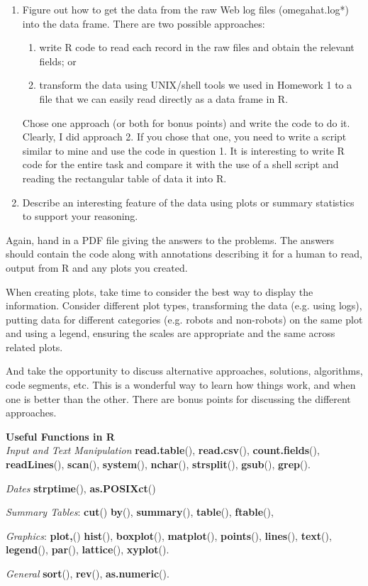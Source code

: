 \documentclass[12pt]{article}
\def\SFunction#1{\textbf{#1}()}
\begin{document}
\begin{enumerate}
\item
Figure out how to get the data from
the raw Web log files (omegahat.log*) 
into the data frame.
There are two possible approaches:
\begin{enumerate}
\item write R code to read each record in the raw files and obtain
  the relevant fields; or
\item transform the data using UNIX/shell tools we used in Homework 1
to a file that we can easily read directly as a data frame in R.
\end{enumerate}
Chose one approach (or both for bonus points) and write
the code to do it.
Clearly, I did approach 2. If you chose that one, you need
to write a script similar to mine and use the code in question 1. 
It is interesting to write R code for the entire task
and compare it with the use of a shell script and reading
the rectangular table of data it into R.


\item Describe an interesting feature of the data
using plots or summary statistics to support
your reasoning.


\end{enumerate} 


Again, hand in a PDF file giving the answers
to the problems.  The answers should contain
the code along with annotations describing it for a human
to read,  output from R and any plots you created.


When creating plots, take time to consider the best
way to display the information.
Consider different plot types, transforming the data
(e.g. using logs),  putting data for different categories
(e.g. robots and non-robots)
on the same plot and using a legend,
ensuring the scales are appropriate and the same across related plots.

And take the opportunity to discuss alternative approaches,
solutions, algorithms, code segments, etc.  This is a wonderful
way to learn how things work, and when one is better than the other.
There are bonus points for discussing the different approaches.


\textbf{Useful Functions in R}\\
\textit{Input and Text Manipulation}
\SFunction{read.table}, \SFunction{read.csv},
\SFunction{count.fields},
\SFunction{readLines},
\SFunction{scan},
\SFunction{system},
\SFunction{nchar},
\SFunction{strsplit},
\SFunction{gsub},
\SFunction{grep}.

\textit{Dates}
\SFunction{strptime},
\SFunction{as.POSIXct}


\textit{Summary Tables}:
\SFunction{cut}
\SFunction{by},
\SFunction{summary},
\SFunction{table},
\SFunction{ftable},

\textit{Graphics}: 
\SFunction{plot,}
\SFunction{hist},
\SFunction{boxplot},
\SFunction{matplot},
\SFunction{points},
\SFunction{lines},
\SFunction{text},
\SFunction{legend},
\SFunction{par},
\SFunction{lattice},
\SFunction{xyplot}.


\textit{General}
\SFunction{sort},
\SFunction{rev},
\SFunction{as.numeric}.
\end{document}
